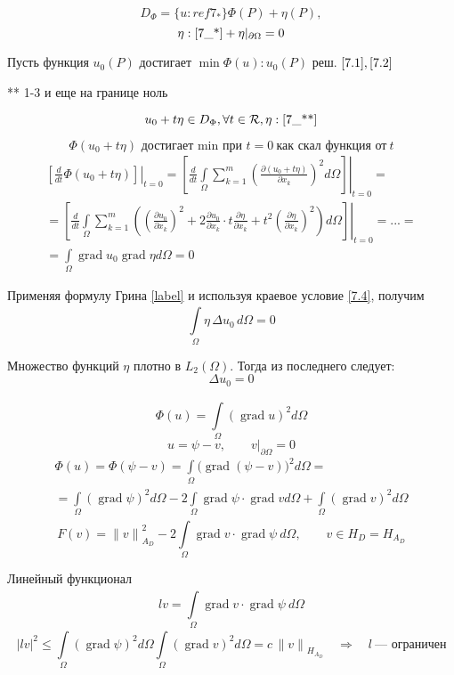 \documentclass[12pt, a4paper]{article}
\newcommand{\Int}{\int\limits}
\newcommand{\Sum}{\sum\limits}
\begin{document}
\[ D_{\Phi} = \{u: ref{7_*} \} \Phi (P) + \eta(P), \]
\[ \eta: \ref{7_*} + \eta|_{\partial  \Omega } = 0 \label{7_4} \]

Пусть функция $ u_0(P) $ достигает $ \min \Phi(u) : u_0(P) $ реш. $ \eqref{7.1}, \eqref{7.2} $

** 1-3 и еще на границе ноль $ \label{7_**}$

\[ u_0 + t \eta \in D_{\Phi}, \forall t \in \mathcal{R}, \eta : \ref{7_**} \]

\[ \Phi(u_0 + t \eta)\textrm{ достигает min при  } t=0 \ \text{как скал функция от} \ t \]
\begin{multline*}
	{\left. \left[ \frac{d}{dt} \Phi(u_0+t \eta) \right] \right|}_{t=0} = {\left. \left[ \frac{d}{dt} \Int_{\Omega}^{} \Sum_{k=1}^{m} {\left(\frac{\partial (u_0 + t\eta)}{\partial x_k}\right)}^2 d\Omega \right] \right|}_{t=0} = \\
	= {\left. \left[ \frac{d}{dt} \Int_{\Omega}^{} \Sum_{k=1}^{m} \left({\left(\frac{\partial u_0}{\partial  x_k}\right)}^2 + 2\frac{\partial u_0}{\partial x_k} \cdot t \frac{\partial \eta}{\partial x_k} + t^2 {\left(\frac{\partial \eta}{\partial x_k}\right)}^2 \right) d\Omega \right] \right|}_{t=0} = ... = \\
	= \Int_{\Omega} \operatorname{grad} u_0 \operatorname{grad} \eta d\Omega = 0
\end{multline*}

Применяя формулу Грина \eqref{label} и используя краевое условие \eqref{7.4}, получим
\[ \Int_{\Omega}^{} \eta \, \Delta u_0 \, d\Omega = 0 \]

Множество функций $\eta$ плотно в $L_2(\Omega)$. Тогда из последнего следует:
\[ \Delta u_0 = 0 \]

\[ \Phi (u) = \Int_{\Omega}^{}(\operatorname{grad} u)^2 d \Omega \]
\[ u = \psi - v, \qquad v|_{\partial \Omega} = 0 \]
\begin{multline*}
	\Phi(u) = \Phi (\psi - v) = \Int_{\Omega}^{} {\bigl(\operatorname{grad} (\psi - v) \bigr)}^2 d\Omega = \\
	= \Int_{\Omega}^{} (\operatorname{grad} \psi)^2 d\Omega - 2 \Int_{\Omega}^{} \operatorname{grad} \psi \cdot \operatorname{grad} v d \Omega + \Int_{\Omega}^{} (\operatorname{grad} v)^2 d \Omega
\end{multline*}
\[ F(v) = {\|v\|}^2_{A_D} - 2 \Int_{\Omega}^{} \operatorname{grad} v \cdot \operatorname{grad} \psi \ d\Omega, \qquad v \in H_D = H_{A_D}\]

Линейный функционал
\[ lv = \Int_{\Omega}^{} \operatorname{grad} v \cdot \operatorname{grad} \psi \ d\Omega \]
\[ {|lv|}^2 \leq \Int_{\Omega}^{} {(\operatorname{grad} \psi)}^2 d\Omega \Int_{\Omega}^{} {(\operatorname{grad} v)}^2 d\Omega = c \, {\|v\|}_{H_{A_D}} \quad \Rightarrow \quad l \ \text{--- ограничен}\]
\end{document}
